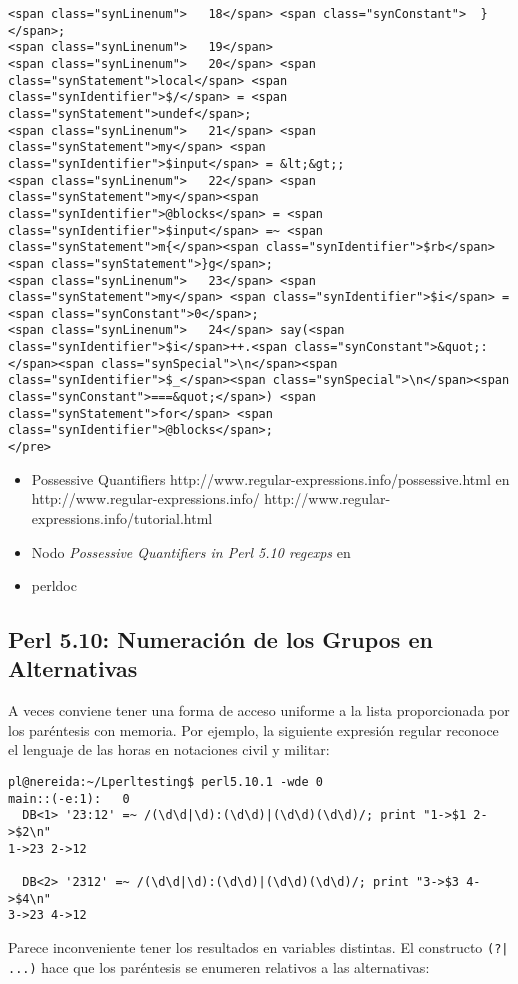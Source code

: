 \begin{verbatim}
<span class="synLinenum">   18</span> <span class="synConstant">  }</span>;
<span class="synLinenum">   19</span> 
<span class="synLinenum">   20</span> <span class="synStatement">local</span> <span class="synIdentifier">$/</span> = <span class="synStatement">undef</span>;
<span class="synLinenum">   21</span> <span class="synStatement">my</span> <span class="synIdentifier">$input</span> = &lt;&gt;;
<span class="synLinenum">   22</span> <span class="synStatement">my</span><span class="synIdentifier">@blocks</span> = <span class="synIdentifier">$input</span> =~ <span class="synStatement">m{</span><span class="synIdentifier">$rb</span><span class="synStatement">}g</span>;
<span class="synLinenum">   23</span> <span class="synStatement">my</span> <span class="synIdentifier">$i</span> = <span class="synConstant">0</span>;
<span class="synLinenum">   24</span> say(<span class="synIdentifier">$i</span>++.<span class="synConstant">&quot;:</span><span class="synSpecial">\n</span><span class="synIdentifier">$_</span><span class="synSpecial">\n</span><span class="synConstant">===&quot;</span>) <span class="synStatement">for</span> <span class="synIdentifier">@blocks</span>;
</pre>

\end{verbatim}


\begin{itemize}
\item
\htmladdnormallink
{Possessive Quantifiers}
{http://www.regular-expressions.info/possessive.html}
en 
\htmladdnormallink
{http://www.regular-expressions.info/}
{http://www.regular-expressions.info/tutorial.html}
\item 
Nodo \emph{Possessive Quantifiers in Perl 5.10 regexps} en 
\item 
perldoc 
\end{itemize}

\subsection{Perl 5.10: Numeración de los Grupos en Alternativas}

A veces conviene tener una forma de acceso 
uniforme a la lista proporcionada por los paréntesis con memoria.
Por ejemplo, la siguiente expresión regular reconoce el 
lenguaje de las horas en notaciones civil y militar:
\begin{verbatim}
pl@nereida:~/Lperltesting$ perl5.10.1 -wde 0
main::(-e:1):   0
  DB<1> '23:12' =~ /(\d\d|\d):(\d\d)|(\d\d)(\d\d)/; print "1->$1 2->$2\n"
1->23 2->12

  DB<2> '2312' =~ /(\d\d|\d):(\d\d)|(\d\d)(\d\d)/; print "3->$3 4->$4\n"
3->23 4->12
\end{verbatim}
Parece inconveniente tener los resultados en variables distintas.
El constructo \verb#(?| ...)# hace que los paréntesis se enumeren
relativos a las alternativas:

